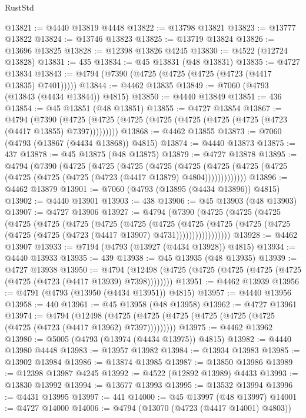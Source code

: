 \begin{lexlean}{RustStd}
\begin{coremodule}
{\begin{coremodule}
{{{{{{{{{{{{{{{{{{{{{{{{{{{{{{{{{{{{{{{{{{{{{{{{{{{{{{{{{{{{@13821 := @4440 @13819 @4448
@13822 := @13798 @13821
@13823 := @13777 @13822
@13824 := @13746 @13823
@13825 := @13719 @13824
@13826 := @13696 @13825
@13828 := @12398 @13826 @4245
@13830 := @4522 (@12724 @13828)
@13831 := 435
@13834 := @45 @13831 (@48 @13831)
@13835 := @4727 @13834
@13843 := @4794 (@7390 (@4725 (@4725 (@4725 (@4723 (@4417 @13835) @7401)))))
@13844 := @4462 @13835
@13849 := @7060 (@4793 (@13843 (@4434 @13844)) @4815)
@13850 := @4440 @13849
@13851 := 436
@13854 := @45 @13851 (@48 @13851)
@13855 := @4727 @13854
@13867 := @4794
    (@7390 (@4725 (@4725 (@4725 (@4725 (@4725 (@4725 (@4725 (@4723 (@4417 @13855) @7397)))))))))
@13868 := @4462 @13855
@13873 := @7060 (@4793 (@13867 (@4434 @13868)) @4815)
@13874 := @4440 @13873
@13875 := 437
@13878 := @45 @13875 (@48 @13875)
@13879 := @4727 @13878
@13895 := @4794
    (@7390
      (@4725
        (@4725
          (@4725
            (@4725
              (@4725
                (@4725 (@4725 (@4725 (@4725 (@4725 (@4725 (@4723 (@4417 @13879) @4804)))))))))))))
@13896 := @4462 @13879
@13901 := @7060 (@4793 (@13895 (@4434 @13896)) @4815)
@13902 := @4440 @13901
@13903 := 438
@13906 := @45 @13903 (@48 @13903)
@13907 := @4727 @13906
@13927 := @4794
    (@7390
      (@4725
        (@4725
          (@4725
            (@4725
              (@4725
                (@4725
                  (@4725
                    (@4725
                      (@4725
                        (@4725
                          (@4725
                            (@4725 (@4725 (@4725 (@4725 (@4723 (@4417 @13907) @4731)))))))))))))))))
@13928 := @4462 @13907
@13933 := @7194 (@4793 (@13927 (@4434 @13928)) @4815)
@13934 := @4440 @13933
@13935 := 439
@13938 := @45 @13935 (@48 @13935)
@13939 := @4727 @13938
@13950 := @4794
    (@12498 (@4725 (@4725 (@4725 (@4725 (@4725 (@4725 (@4723 (@4417 @13939) @7398))))))))
@13951 := @4462 @13939
@13956 := @4791 (@4793 (@13950 (@4434 @13951)) @4815)
@13957 := @4440 @13956
@13958 := 440
@13961 := @45 @13958 (@48 @13958)
@13962 := @4727 @13961
@13974 := @4794
    (@12498 (@4725 (@4725 (@4725 (@4725 (@4725 (@4725 (@4725 (@4723 (@4417 @13962) @7397)))))))))
@13975 := @4462 @13962
@13980 := @5005 (@4793 (@13974 (@4434 @13975)) @4815)
@13982 := @4440 @13980 @4448
@13983 := @13957 @13982
@13984 := @13934 @13983
@13985 := @13902 @13984
@13986 := @13874 @13985
@13987 := @13850 @13986
@13989 := @12398 @13987 @4245
@13992 := @4522 (@12892 @13989) @4433
@13993 := @13830 @13992
@13994 := @13677 @13993
@13995 := @13532 @13994
@13996 := @4431 @13995
@13997 := 441
@14000 := @45 @13997 (@48 @13997)
@14001 := @4727 @14000
@14006 := @4794 (@13070 (@4723 (@4417 @14001) @4803))
}}}}}}}}}}}}}}}}}}}}}}}}}}}}}}}}}}}}}}}}}}}}}}}}}}}}}}}}}}}}
\end{coremodule}}
\end{coremodule}
\end{lexlean}
